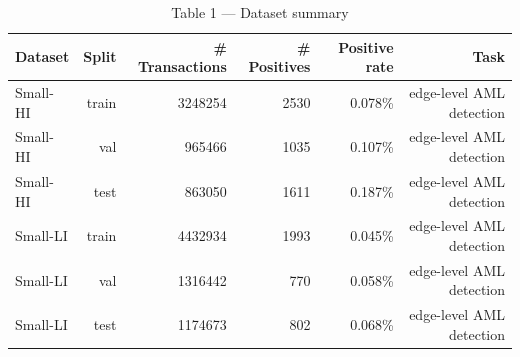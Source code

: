 \begin{table}[t]
\centering
\caption{Table 1 — Dataset summary}
\begin{tabular}{lrrrrr}
\toprule
Dataset & Split & \# Transactions & \# Positives & Positive rate & Task \\
\midrule
Small-HI & train & 3248254 & 2530 & 0.078\% & edge-level AML detection \\
Small-HI & val & 965466 & 1035 & 0.107\% & edge-level AML detection \\
Small-HI & test & 863050 & 1611 & 0.187\% & edge-level AML detection \\
Small-LI & train & 4432934 & 1993 & 0.045\% & edge-level AML detection \\
Small-LI & val & 1316442 & 770 & 0.058\% & edge-level AML detection \\
Small-LI & test & 1174673 & 802 & 0.068\% & edge-level AML detection \\
\bottomrule
\end{tabular}
\end{table}
